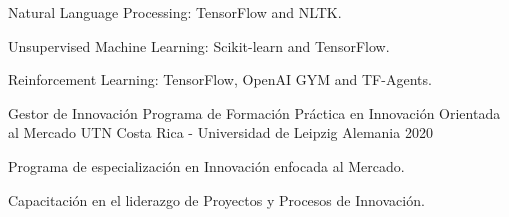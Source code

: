 \begin{cventries}
{\begin{cvitems}
        \item Natural Language Processing: TensorFlow and NLTK.
        \item Unsupervised Machine Learning: Scikit-learn and TensorFlow.
        \item Reinforcement Learning: TensorFlow, OpenAI GYM and TF-Agents.
      \end{cvitems}
    }
  \cventry
  {Gestor de Innovación} %
    {Programa de Formación Práctica en Innovación Orientada al
    Mercado} %
    {UTN Costa Rica - Universidad de Leipzig Alemania} %
    {2020} %
    {
      \begin{cvitems} %
        \item Programa de especialización en Innovación enfocada al
        Mercado.
        \item Capacitación en el liderazgo de Proyectos y Procesos de
        Innovación.
      \end{cvitems}
    }

\end{cventries}
